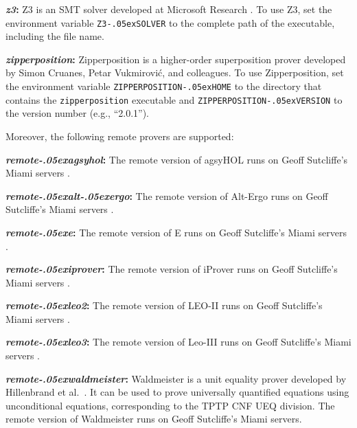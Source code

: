 \documentclass[a4paper,12pt]{article}
\renewcommand\_{\hbox{\textunderscore\kern-.05ex}}
\begin{document}
\begin{enum}
\begin{sloppy}
\begin{enum}
\item[\labelitemi] \textbf{\textit{z3}:} Z3 is an SMT solver developed at
Microsoft Research \cite{de-moura-2008}. To use Z3, set the environment variable
\texttt{Z3\_SOLVER} to the complete path of the executable, including the
file name.

\item[\labelitemi] \textbf{\textit{zipperposition}:} Zipperposition
\cite{cruanes-2014} is a higher-order superposition prover developed by Simon
Cruanes, Petar Vukmirovi\'c, and colleagues. To use Zipperposition, set the
environment variable \texttt{ZIPPERPOSITION\_HOME} to the directory that
contains the \texttt{zipperposition} executable and
\texttt{ZIPPERPOSITION\_VERSION} to the version number (e.g., ``2.0.1'').
\end{enum}

\end{sloppy}

Moreover, the following remote provers are supported:

\begin{enum}
\item[\labelitemi] \textbf{\textit{remote\_agsyhol}:} The remote version of
agsyHOL runs on Geoff Sutcliffe's Miami servers \cite{sutcliffe-2000}.

\item[\labelitemi] \textbf{\textit{remote\_alt\_ergo}:} The remote version of
Alt-Ergo runs on Geoff Sutcliffe's Miami servers \cite{sutcliffe-2000}.

\item[\labelitemi] \textbf{\textit{remote\_e}:} The remote version of E runs
on Geoff Sutcliffe's Miami servers \cite{sutcliffe-2000}.

\item[\labelitemi] \textbf{\textit{remote\_iprover}:} The
remote version of iProver runs on Geoff Sutcliffe's Miami servers
\cite{sutcliffe-2000}.

\item[\labelitemi] \textbf{\textit{remote\_leo2}:} The remote version of LEO-II
runs on Geoff Sutcliffe's Miami servers \cite{sutcliffe-2000}.

\item[\labelitemi] \textbf{\textit{remote\_leo3}:} The remote version of Leo-III
runs on Geoff Sutcliffe's Miami servers \cite{sutcliffe-2000}.

\item[\labelitemi] \textbf{\textit{remote\_waldmeister}:} Waldmeister is a unit
equality prover developed by Hillenbrand et al.\ \cite{waldmeister}. It can be
used to prove universally quantified equations using unconditional equations,
corresponding to the TPTP CNF UEQ division. The remote version of Waldmeister
runs on Geoff Sutcliffe's Miami servers.


\end{enum}
\end{enum}
\end{document}
